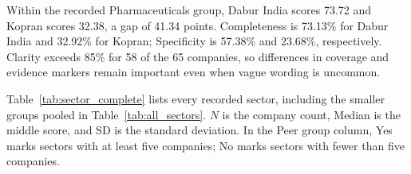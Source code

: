 \FloatBarrier

Within the recorded Pharmaceuticals group, Dabur India scores 73.72 and Kopran scores 32.38, a gap of 41.34 points. Completeness is 73.13\% for Dabur India and 32.92\% for Kopran; Specificity is 57.38\% and 23.68\%, respectively. Clarity exceeds 85\% for 58 of the 65 companies, so differences in coverage and evidence markers remain important even when vague wording is uncommon.

Table~\ref{tab:sector_complete} lists every recorded sector, including the smaller groups pooled in Table~\ref{tab:all_sectors}. $N$ is the company count, Median is the middle score, and SD is the standard deviation. In the Peer group column, Yes marks sectors with at least five companies; No marks sectors with fewer than five companies.


